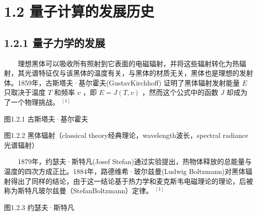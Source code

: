 \documentclass[a4paper,11pt,english]{sphinxmanual}
\begin{document}
\section{1.2 量子计算的发展历史}
\label{\detokenize{rst/1.2_u91cf_u5b50_u8ba1_u7b97_u7684_u53d1_u5c55_u5386_u53f2:id1}}\label{\detokenize{rst/1.2_u91cf_u5b50_u8ba1_u7b97_u7684_u53d1_u5c55_u5386_u53f2::doc}}

\subsection{1.2.1 量子力学的发展}
\label{\detokenize{rst/1.2_u91cf_u5b50_u8ba1_u7b97_u7684_u53d1_u5c55_u5386_u53f2:id2}}
\sphinxAtStartPar
  理想黑体可以吸收所有照射到它表面的电磁辐射，并将这些辐射转化为热辐射，其光谱特征仅与该黑体的温度有关，与黑体的材质无关，黑体也是理想的发射体。1859年，古斯塔夫·基尔霍夫(GustavKirchhoff) 证明了黑体辐射发射能量 \(E\) 只取决于温度 \(T\) 和频率 \(v\) ，即 \(E = J ( T,v )\) ，然而这个公式中的函数 \(J\) 却成为了一个物理挑战。 \(^{[1]}\)


\begin{center}图1.2.1 古斯塔夫·基尔霍夫
\end{center}

\begin{center}图1.2.2 黑体辐射（classical theory\sphinxhyphen{}经典理论，wavelength\sphinxhyphen{}波长，spectral radiance\sphinxhyphen{}光谱辐射）
\end{center}
\sphinxAtStartPar
  1879年，约瑟夫·斯特凡(Josef Stefan)通过实验提出，热物体释放的总能量与温度的四次方成正比。1884年，路德维希·玻尔兹曼(Ludwig Boltzmann)对黑体辐射得出了同样的结论，由于这一结论基于热力学和麦克斯韦电磁理论的理论，后被称为斯特凡\sphinxhyphen{}玻尔兹曼（Stefan\sphinxhyphen{}Boltzmann）定律。 \(^{[1]}\)


\begin{center}图1.2.3 约瑟夫·斯特凡
\end{center}
\end{document}
